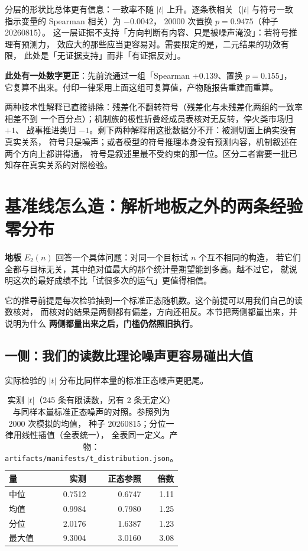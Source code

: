 \documentclass[11pt]{ctexart}
\begin{document}
分层的形状比总体更有信息：一致率不随 $|t|$ 上升。逐条秩相关（$|t|$ 与符号一致
指示变量的 Spearman 相关）为 $-0.0042$，
20000 次置换 $p=0.9475$（种子 20260815）。
这一层证据不支持「方向判断有内容、只是被噪声淹没」：若符号推理有预测力，
效应大的那些应当更容易对。需要限定的是，二元结果的功效有限，
此处是「无证据支持」而非「有证据反对」。

\textbf{此处有一处数字更正}：先前流通过一组「Spearman $+0.139$、置换 $p=0.155$」，
它复算不出来。付印一律采用上面这组可复算值，产物随报告重建而重算。

两种技术性解释已直接排除：残差化不翻转符号（残差化与未残差化两组的一致率相差不到
一个百分点）；机制族的极性折叠经成员表核对无反转，停火类市场归 $+1$、
战事推进类归 $-1$。剩下两种解释用这批数据分不开：被测切面上确实没有真实关系，
符号只是噪声；或者模型的符号推理本身没有预测内容，机制叙述在两个方向上都讲得通，
符号是叙述里最不受约束的那一位。区分二者需要一批已知存在真实关系的对照检验。

\section{基准线怎么造：解析地板之外的两条经验零分布}\label{sec:nullbase}
\textbf{地板} $E_2(n)$ 回答一个具体问题：对同一个目标试 $n$ 个互不相同的构造，
若它们全都与目标无关，其中绝对值最大的那个统计量期望能到多高。越不过它，
就说明这次的最好成绩不比「试很多次的运气」更值得相信。

它的推导前提是每次检验抽到一个标准正态随机数。这个前提可以用我们自己的读数核对，
而核对的结果是两侧都有偏差，方向还相反。本节把两侧都量出来，并说明为什么
\textbf{两侧都量出来之后，门槛仍然照旧执行}。

\subsection{一侧：我们的读数比理论噪声更容易碰出大值}
实际检验的 $|t|$ 分布比同样本量的标准正态噪声更肥尾。

\begin{table}[htbp]\centering\footnotesize
\begin{tabular}{@{}>{\raggedright\arraybackslash}p{} r r r@{}}
\toprule
量 & 实测 & 正态参照 & 倍数 \\ \midrule
中位 & 0.7512 & 0.6747 &
  1.11 \\
均值 & 0.9984 & 0.7980 &
  1.25 \\
90 分位 & 2.0176 & 1.6387 &
  1.23 \\
最大值 & 9.3004 & 3.0160 &
  3.08 \\
\bottomrule\end{tabular}
\caption{实测 $|t|$（245 条有限读数，另有 2 条无定义）
与同样本量标准正态噪声的对照。参照列为 2000 次模拟的均值，
种子 20260815；分位一律用线性插值（全表统一），
全表同一定义。产物：\texttt{artifacts/manifests/t\_distribution.json}。}
\end{table}
\end{document}
